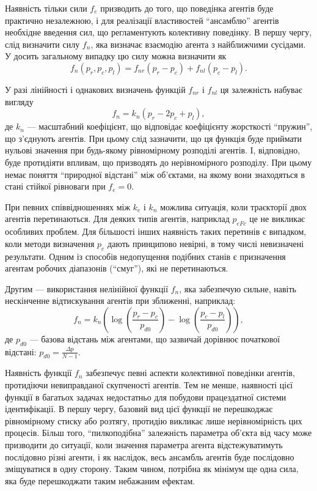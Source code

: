 Наявність тільки сили $f_e$ призводить до того, що поведінка агентів буде
практично незалежною, і для реалізації властивостей ``ансамблю'' агентів
необхідне введення сил, що регламентують колективну поведінку. В першу чергу,
слід визначити силу $f_n$, яка визначає взаємодію агента з найближчими
сусідами. У досить загальному випадку цю силу можна визначити як
%
\begin{equation}
  f_n( p_r, p_c, p_l ) = f_{nr}(p_r-p_c) + f_{nl}(p_c-p_l).
  \label{atu:eq:f_n_gen}
\end{equation}

У разі лінійності і однакових визначень функцій $f_{nr}$ і $f_{nl}$ ця залежність набуває вигляду
%
\begin{equation}
  f_n = k_n ( p_r - 2 p_c + p_l ),
  \label{atu:eq:f_n_lin}
\end{equation}
%
де $k_n$ --- масштабний коефіцієнт, що відповідає коефіцієнту жорсткості
``пружин'', що з'єднують агентів. При цьому слід зазначити, що ця функція буде
приймати нульові значення при будь-якому рівномірному розподілі агентів.
І, відповідно, буде протидіяти впливам, що призводять до
нерівномірного розподілу. При цьому немає поняття ``природної відстані''
між об'єктами, на якому вони знаходяться в стані стійкої рівноваги при
$ f_e = 0 $.

При певних співвідношеннях між
$ k_e $ і
$ k_n $ можлива ситуація, коли траєкторії двох агентів
перетинаються. Для деяких типів агентів, наприклад
$ p_{eFc} $ це не викликає особливих проблем. Для більшості інших
наявність таких перетинів є випадком, коли методи визначення
$p_e$ дають принципово невірні, в тому числі невизначені
результати. Одним із способів недопущення подібних станів є
призначення агентам робочих діапазонів (``смуг''), які не перетинаються.

Другим --- використання нелінійної функції $f_n$,
яка забезпечую сильне, навіть нескінченне відтискування
агентів при зближенні, наприклад:
%
\begin{equation}
  f_n = k_n \left( \log\left( \frac{p_r-p_c}{p_{d0}} \right) -  \log\left( \frac{p_c-p_l}{p_{d0}}\right) \right),
  \label{atu:eq:f_n_log}
\end{equation}
%
де
$p_{d0}$ ---
базова відстань між агентами, що зазвичай дорівнює початкової відстані:
$p_{d0} = \frac{\Delta p}{N-1}$.




Наявність функції
$ f_n $ забезпечує певні аспекти колективної поведінки агентів,
протидіючи невиправданої скупченості агентів. Тем не менше,
наявності цієї функції в багатьох задачах недостатньо для
побудови працездатної системи ідентифікації. В першу чергу,
базовий вид цієї функції не перешкоджає рівномірному стиску
або розтягу, протидію викликає лише нерівномірність цих
процесів. Більш того, ``пилкоподібна'' залежність параметра
об'єкта від часу може призводити до ситуації, коли значення
параметра агента відстежуватимуть послідовно різні агенти, і
як наслідок, весь ансамбль агентів буде послідовно зміщуватися
в одну сторону. Таким чином, потрібна як мінімум ще одна сила,
яка буде перешкоджати таким небажаним ефектам.

